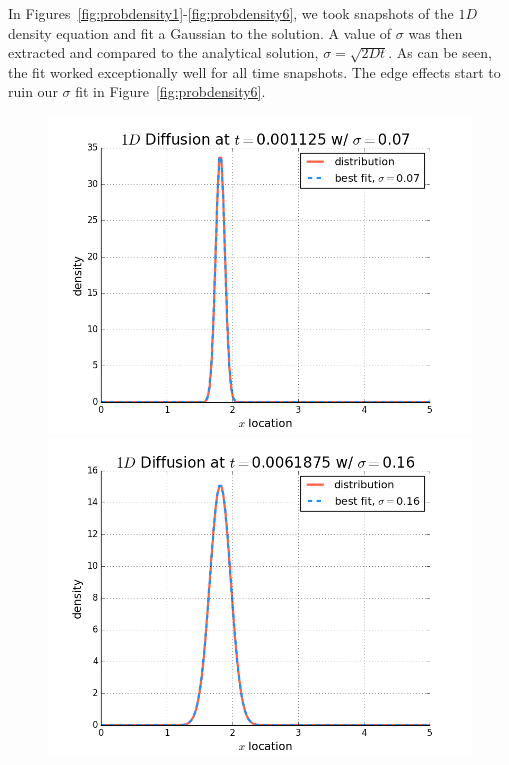 \documentclass[10pt]{article}
\begin{document}
In Figures~\ref{fig:probdensity1}-\ref{fig:probdensity6}, we took snapshots of the $1D$ density equation and fit a Gaussian to the solution. A value of $\sigma$ was then extracted and compared to the analytical solution, $\sigma=\sqrt{2Dt}$. As can be seen, the fit worked exceptionally well for all time snapshots. The edge effects start to ruin our $\sigma$ fit in Figure~\ref{fig:probdensity6}.
\begin{figure}[!htb]
  \includegraphics[width=\linewidth]{probdensityt10.png}
  \caption{}\label{fig:probdensity1}
\endminipage\hfill
{}
  \includegraphics[width=\linewidth]{probdensityt55.png}
  \caption{}\label{fig:probdensity2}
\endminipage\hfill \\

\end{figure}
\end{document}
